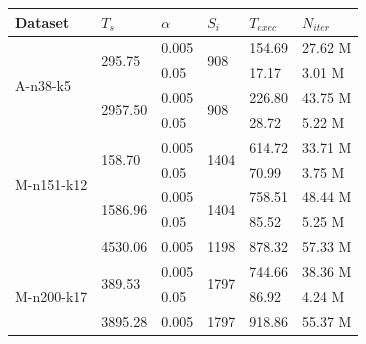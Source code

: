 \begin{table}[h!]
    \centering
    \begin{threeparttable}
    \footnotesize
        \begin{tabularx}{0.45\textwidth}{ l l l l X X }
            \toprule
            \textbf{Dataset} & $T_s$ & $\alpha$ & $S_i$ & $T_{exec}$ & $N_{iter}$ \\ [0.5ex]
            \midrule
            \multirow{4}{*}{A-n38-k5}   & \multirow{2}{*}{295.75}   & 0.005 & \multirow{2}{*}{908}\tnote{1}  & 154.69    & 27.62 M   \\ [0.5ex]
                                        &                           & 0.05  &                       & 17.17     & 3.01 M    \\ [0.5ex]
            \cmidrule{2-6}
                                        & \multirow{2}{*}{2957.50}  & 0.005 & \multirow{2}{*}{908}\tnote{1}  & 226.80    & 43.75 M   \\ [0.5ex]
                                        &                           & 0.05  &                       & 28.72     & 5.22 M    \\ [0.5ex]
            \midrule
            \multirow{4}{*}{M-n151-k12} & \multirow{2}{*}{158.70}   & 0.005 & \multirow{2}{*}{1404}\tnote{1} & 614.72    & 33.71 M   \\ [0.5ex]
                                        &                           & 0.05  &                       & 70.99     & 3.75 M    \\ [0.5ex]
            \cmidrule{2-6}
                                        & \multirow{2}{*}{1586.96}  & 0.005 & \multirow{2}{*}{1404}\tnote{1} & 758.51    & 48.44 M   \\ [0.5ex]
                                        &                           & 0.05  &                       & 85.52     & 5.25 M    \\ [0.5ex]
            \cmidrule{2-6}
                                        & 4530.06                   & 0.005 & 1198\tnote{2}                  & 878.32    & 57.33 M   \\ [0.5ex]
            \midrule
            \multirow{4}{*}{M-n200-k17} & \multirow{2}{*}{389.53}   & 0.005 & \multirow{2}{*}{1797}\tnote{1} & 744.66    & 38.36 M   \\ [0.5ex]
                                        &                           & 0.05  &                       & 86.92     & 4.24 M    \\ [0.5ex]
            \cmidrule{2-6}
                                        & \multirow{4}{*}{3895.28}  & 0.005 & \multirow{4}{*}{1797}\tnote{1} & 918.86    & 55.37 M   \\ [0.5ex]

\end{tabularx}
\end{threeparttable}
\end{table}
